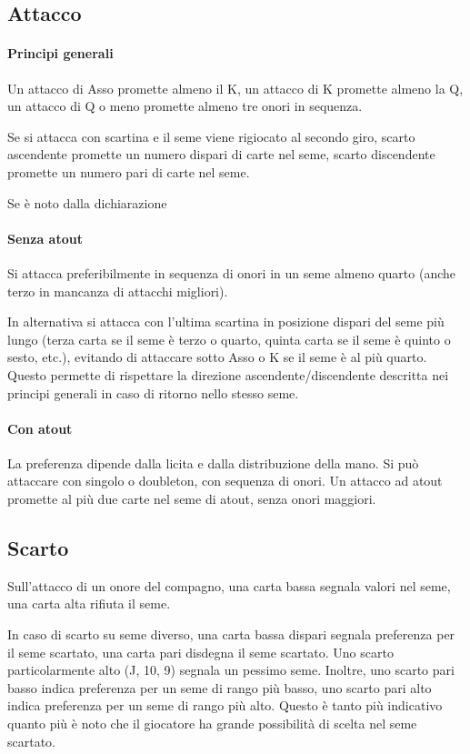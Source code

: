 \documentclass[a4paper,10pt]{article}
\begin{document}
\subsection{Attacco}

\paragraph{Principi generali} Un attacco di Asso promette almeno il K, un attacco di K promette almeno la Q, un attacco di Q o meno promette almeno tre onori in sequenza.

Se si attacca con scartina e il seme viene rigiocato al secondo giro, scarto ascendente promette un numero dispari di carte nel seme, scarto discendente promette un numero pari di carte nel seme.

Se è noto dalla dichiarazione

\paragraph{Senza atout} Si attacca preferibilmente in sequenza di onori in un seme almeno quarto (anche terzo in mancanza di attacchi migliori).

In alternativa si attacca con l'ultima scartina in posizione dispari del seme più lungo (terza carta se il seme è terzo o quarto, quinta carta se il seme è quinto o sesto, etc.), evitando di attaccare sotto Asso o K se il seme è al più quarto. Questo permette di rispettare la direzione ascendente/discendente descritta nei principi generali in caso di ritorno nello stesso seme.

\paragraph{Con atout} La preferenza dipende dalla licita e dalla distribuzione della mano. Si può attaccare con singolo o doubleton, con sequenza di onori. Un attacco ad atout promette al più due carte nel seme di atout, senza onori maggiori.

\subsection{Scarto}

Sull'attacco di un onore del compagno, una carta bassa segnala valori nel seme, una carta alta rifiuta il seme.

In caso di scarto su seme diverso, una carta bassa dispari segnala preferenza per il seme scartato, una carta pari disdegna il seme scartato. Uno scarto particolarmente alto (J, 10, 9) segnala un pessimo seme. Inoltre, uno scarto pari basso indica preferenza per un seme di rango più basso, uno scarto pari alto indica preferenza per un seme di rango più alto. Questo è tanto più indicativo quanto più è noto che il giocatore ha grande possibilità di scelta nel seme scartato.
\end{document}
